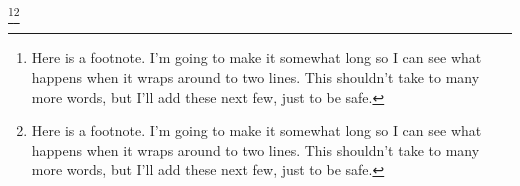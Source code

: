 \documentclass[twoside]{memoir}
\begin{document}
\begin{multicols*}{2}
\noindent
\normalsize
{}\footnote{Here is a footnote. I'm going to make it somewhat long so I can see what happens when it wraps around to two lines. This shouldn't take to many more words, but I'll add these next few, just to be safe.}\footnote{Here is a footnote. I'm going to make it somewhat long so I can see what happens when it wraps around to two lines. This shouldn't take to many more words, but I'll add these next few, just to be safe.}\par
\pagebreak
\end{multicols*}
\end{document}

